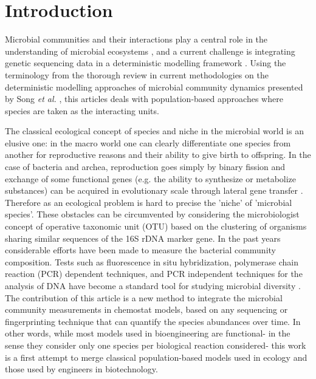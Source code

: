 \documentclass[processes,article,submit,moreauthors,pdftex]{Definitions/mdpi}
\begin{document}


\section{Introduction}


Microbial communities and their interactions play a central role in the understanding of microbial ecosystems \cite{West2007}, and a current challenge is integrating genetic sequencing data in a deterministic modelling framework \cite{Widder2016,WADE201664}. Using the terminology from the thorough review in current methodologies on the deterministic modelling approaches of microbial community dynamics presented by Song \textit{et al.} \cite{Song2014}, this articles deals with population-based approaches where species are taken as the interacting units.

The classical ecological concept of species and niche in the microbial world is an elusive one: in the macro world one can clearly differentiate one species from another for reproductive reasons and their ability to give birth to offspring. In the case of bacteria and archea, reproduction goes simply by binary fission and exchange of some functional genes (e.g. the ability to synthesize or metabolize substances) can be acquired in evolutionary scale through lateral gene transfer \cite{Boucher2003}. Therefore as an ecological problem is hard to precise the 'niche' of 'microbial species'. These obstacles can be circumvented by considering the microbiologist concept of operative taxonomic unit (OTU) based on the clustering of organisms sharing similar sequences of the 16S rDNA marker gene. In the past years considerable efforts have been made to measure the bacterial community composition. Tests such as fluorescence in situ hybridization, polymerase chain reaction (PCR) dependent techniques, and PCR independent techniques for the analysis of DNA have become a standard tool for studying  microbial diversity \cite{FERRERA2016790}. The contribution of this article is a new method to integrate the microbial community measurements in chemostat models, based on any sequencing or fingerprinting technique that can quantify the species abundances over time. In other words, while most models used in bioengineering are functional- in the sense they consider only one species per biological reaction considered- this work is a first attempt to merge classical population-based models used in ecology and those used by engineers in biotechnology.
\end{document}
